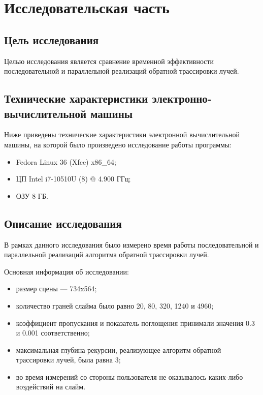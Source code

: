 \chapter{Исследовательская часть}

\section{Цель исследования}

Целью исследования является сравнение временной эффективности последовательной и параллельной реализаций обратной трассировки лучей.

\section{Технические характеристики электронно-вычислительной машины}

Ниже приведены технические характеристики электронной вычислительной машины, на которой было произведено исследование работы программы:

\begin{itemize}
	\item Fedora Linux 36 (Xfce) x86\_64;
	\item ЦП Intel i7-10510U (8) @ 4.900 ГГц;
	\item ОЗУ 8 ГБ.
\end{itemize}

\section{Описание исследования}

В рамках данного исследования было измерено время работы последовательной и параллельной реализаций алгоритма обратной трассировки лучей.

Основная информация об исследовании:
\begin{itemize}
	\item размер сцены --- 734x564;
	
	\item количество граней слайма было равно 20, 80, 320, 1240 и 4960;
	
	\item коэффициент пропускания и показатель поглощения принимали значения 0.3 и 0.001 соответственно;
	
	\item максимальная глубина рекурсии, реализующее алгоритм обратной трассировки лучей, была равна 3;
	
	\item во время измерений со стороны пользователя не оказывалось каких-либо воздействий на слайм.
\end{itemize}

